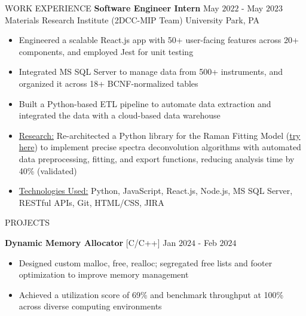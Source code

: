 \documentclass{resume} %
\begin{document}
\begin{rSection}{WORK EXPERIENCE}
{\bf Software Engineer Intern} \hfill May $2022$ - May $2023$\\
Materials Research Institute (2DCC-MIP Team) \hfill University Park, PA
\begin{itemize}[itemsep = -4pt]
    \item Engineered a scalable React.js app with 50+ user-facing features across 20+ components, and employed Jest for unit testing
    \item Integrated MS SQL Server to manage data from 500+ instruments, and organized it across 18+ BCNF-normalized tables
    \item Built a Python-based ETL pipeline to automate data extraction and integrated the data with a cloud-based data warehouse
    \item \underline{Research:} Re-architected a Python library for the Raman Fitting Model ({\href{https://github.com/harshitjain17/Raman-Peak-Fitting-Model/}{try here}}) to implement precise spectra deconvolution algorithms with automated data preprocessing, fitting, and export functions, reducing analysis time by 40\% (validated)
    \item \underline{Technologies Used:} Python, JavaScript, React.js, Node.js, MS SQL Server, RESTful APIs, Git, HTML/CSS, JIRA
\end{itemize}

\end{rSection} 



\begin{rSection}{PROJECTS}

{\bf Dynamic Memory Allocator }{[C/C++] } \hfill Jan $2024$ - Feb $2024$
\begin{itemize}[itemsep = -4pt]
    \item Designed custom malloc, free, realloc; segregated free lists and footer optimization to improve memory management
    \item Achieved a utilization score of 69\% and benchmark throughput at 100\% across diverse computing environments
\end{itemize}

\end{rSection}
\end{document}
